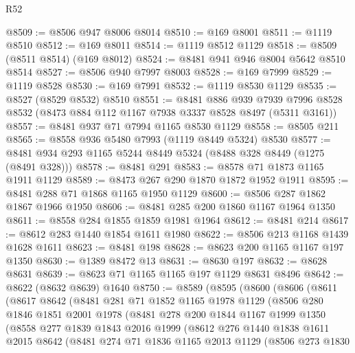 \begin{lexlean}{R52}
\begin{coremodule}
@8509 := @8506 @947 @8006 @8014
@8510 := @169 @8001
@8511 := @1119 @8510
@8512 := @169 @8011
@8514 := @1119 @8512 @1129
@8518 := @8509 (@8511 @8514) (@169 @8012)
@8524 := @8481 @941 @946 @8004 @5642 @8510 @8514
@8527 := @8506 @940 @7997 @8003
@8528 := @169 @7999
@8529 := @1119 @8528
@8530 := @169 @7991
@8532 := @1119 @8530 @1129
@8535 := @8527 (@8529 @8532) @8510
@8551 := @8481
    @886
    @939
    @7939
    @7996
    @8528
    @8532
    (@8473 @884 @112 @1167 @7938 @3337 @8528 @8497 (@5311 @3161))
@8557 := @8481 @937 @71 @7994 @1165 @8530 @1129
@8558 := @8505 @211
@8565 := @8558 @936 @5480 @7993 (@1119 @8449 @5324) @8530
@8577 := @8481 @934 @293 @1165 @5244 @8449 @5324 (@8488 @328 @8449 (@1275 (@8491 @328)))
@8578 := @8481 @291
@8583 := @8578 @71 @1873 @1165 @1911 @1129
@8589 := @8473 @267 @290 @1870 @1872 @1952 @1911
@8595 := @8481 @288 @71 @1868 @1165 @1950 @1129
@8600 := @8506 @287 @1862 @1867 @1966 @1950
@8606 := @8481 @285 @200 @1860 @1167 @1964 @1350
@8611 := @8558 @284 @1855 @1859 @1981 @1964
@8612 := @8481 @214
@8617 := @8612 @283 @1440 @1854 @1611 @1980
@8622 := @8506 @213 @1168 @1439 @1628 @1611
@8623 := @8481 @198
@8628 := @8623 @200 @1165 @1167 @197 @1350
@8630 := @1389 @8472 @13
@8631 := @8630 @197
@8632 := @8628 @8631
@8639 := @8623 @71 @1165 @1165 @197 @1129 @8631 @8496
@8642 := @8622 (@8632 @8639) @1640
@8750 := @8589
    (@8595
      (@8600
        (@8606
          (@8611
            (@8617
              @8642
              (@8481
                @281
                @71
                @1852
                @1165
                @1978
                @1129
                (@8506
                  @280
                  @1846
                  @1851
                  @2001
                  @1978
                  (@8481
                    @278
                    @200
                    @1844
                    @1167
                    @1999
                    @1350
                    (@8558
                      @277
                      @1839
                      @1843
                      @2016
                      @1999
                      (@8612
                        @276
                        @1440
                        @1838
                        @1611
                        @2015
                        @8642
                        (@8481
                          @274
                          @71
                          @1836
                          @1165
                          @2013
                          @1129
                          (@8506
                            @273
                            @1830

\end{coremodule}
\end{lexlean}
